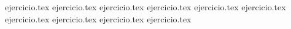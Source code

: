 \vspace{1em}
\begin{enumerate}
    \setcounter{enumi}{38}
    {ejercicio.tex}
    {ejercicio.tex}
    {ejercicio.tex}
    {ejercicio.tex}
    {ejercicio.tex}
    {ejercicio.tex}
    {ejercicio.tex}
    {ejercicio.tex}
    {ejercicio.tex}
    {ejercicio.tex}
\end{enumerate}
